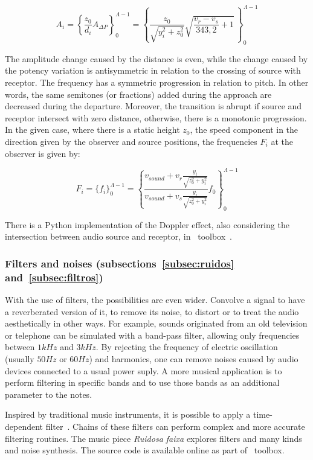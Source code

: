 \begin{equation}\label{eq:aDoppler}
    A_i=\left\{ \frac{z_0}{d_i}A_{\Delta P}\right\}_0^{\Lambda-1} = \left\{ \frac{z_0}{\sqrt{y_i^2+z_0^2}} \sqrt{\frac{v_r-v_s}{343,2}+1}  \,\right\}_0^{\Lambda-1}
\end{equation}

The amplitude change caused by the distance is even, while the change caused by the potency variation is antisymmetric in
relation to the crossing of source with receptor. The frequency has a symmetric progression in relation to pitch. In other words, the same semitones (or fractions) added during the approach are decreased during the departure. Moreover, the transition is abrupt if source and receptor intersect with zero distance, otherwise, there is a monotonic progression. In the given case, where there is a static height $z_0$, the speed component in the direction given by the observer and source positions, the frequencies $F_i$ at the observer is given by:

\begin{equation}\label{eq:ffDoppler}
    F_i=\{f_i\}_0^{\Lambda-1}=\left\{\frac{v_{sound} + v_r\frac{y_i}{\sqrt{z_0^2+y_i^2}}}{v_{sound}+v_s\frac{y_i}{\sqrt{z_0^2+y_i^2}}}f_0\right\}_0^{\Lambda-1}
\end{equation}

There is a Python implementation of the Doppler effect, also considering the intersection between audio source and receptor, in \massa\ toolbox~\cite{MASSA}.


\subsubsection{Filters and noises (subsections~\ref{subsec:ruidos} and~\ref{subsec:filtros})}

With the use of filters, the possibilities are even wider.
Convolve a signal to have a reverberated version of it, to remove its noise, to distort or to treat the audio aesthetically in other ways. For example, sounds originated from an old television or telephone can be simulated with a band-pass filter, allowing only frequencies between $1kHz$ and $3kHz$. By rejecting the frequency of electric oscillation (usually $50Hz$ or $60Hz$) and harmonics, one can remove noises caused by audio devices connected to a usual power suply. A more musical application is to perform filtering in specific bands and to use those bands as an additional parameter to the notes.

Inspired by traditional music instruments, it is possible to apply a
time-dependent filter~\cite{Roederer}. Chains of these filters can perform complex and more accurate filtering routines. The music piece \emph{Ruidosa faixa} explores filters and many kinds and noise synthesis. The source code is available online as part of \massa\ toolbox.

